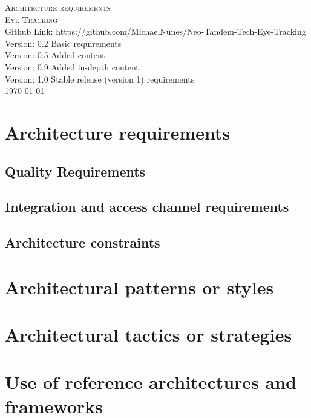 \documentclass[a4paper,12pt]{report}
\begin{document}
\renewcommand{\thesection}{\arabic{section}}
\newpage
\begin{center}
\textsc{\LARGE Architecture requirements}\\[1.5cm]
\textsc{\Large Eye Tracking}\\[0.5cm]

Github Link: https://github.com/MichaelNunes/Neo-Tandem-Tech-Eye-Tracking
\linebreak \linebreak
Version: 0.2 Basic requirements \\
Version: 0.5 Added content\\
Version: 0.9 Added in-depth content\\
Version: 1.0 Stable release (version 1) requirements\\
\today
\end{center}
\tableofcontents{}


\section{Architecture requirements}

\subsection{Quality Requirements}
	
\subsection{Integration and access channel requirements}
	
\subsection{Architecture constraints}
	
\section{Architectural patterns or styles}
	
\section{Architectural tactics or strategies}
	
\section{Use of reference architectures and frameworks}
	
\end{document}
